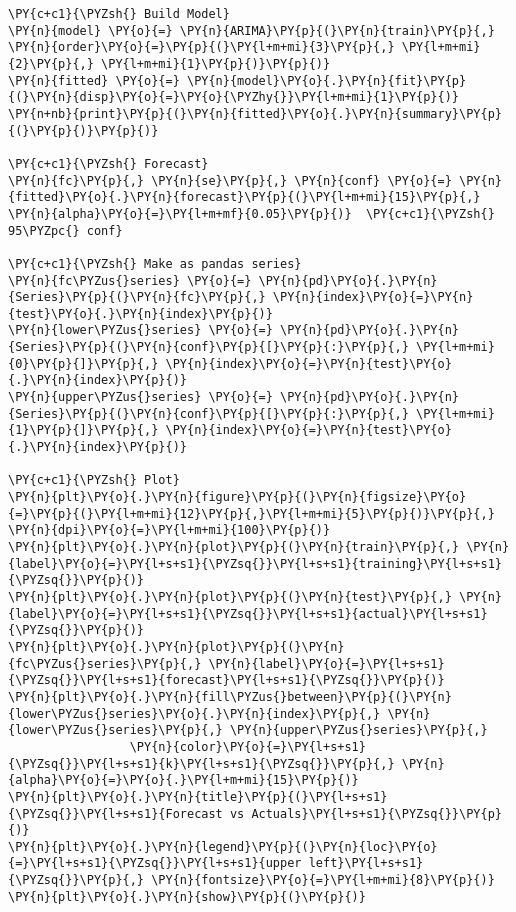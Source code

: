 \begin{tcolorbox}[breakable, size=fbox, boxrule=1pt, pad at break*=1mm,colback=cellbackground, colframe=cellborder]
\begin{Verbatim}[commandchars=\\\{\}]
\PY{c+c1}{\PYZsh{} Build Model}
\PY{n}{model} \PY{o}{=} \PY{n}{ARIMA}\PY{p}{(}\PY{n}{train}\PY{p}{,} \PY{n}{order}\PY{o}{=}\PY{p}{(}\PY{l+m+mi}{3}\PY{p}{,} \PY{l+m+mi}{2}\PY{p}{,} \PY{l+m+mi}{1}\PY{p}{)}\PY{p}{)}  
\PY{n}{fitted} \PY{o}{=} \PY{n}{model}\PY{o}{.}\PY{n}{fit}\PY{p}{(}\PY{n}{disp}\PY{o}{=}\PY{o}{\PYZhy{}}\PY{l+m+mi}{1}\PY{p}{)}  
\PY{n+nb}{print}\PY{p}{(}\PY{n}{fitted}\PY{o}{.}\PY{n}{summary}\PY{p}{(}\PY{p}{)}\PY{p}{)}

\PY{c+c1}{\PYZsh{} Forecast}
\PY{n}{fc}\PY{p}{,} \PY{n}{se}\PY{p}{,} \PY{n}{conf} \PY{o}{=} \PY{n}{fitted}\PY{o}{.}\PY{n}{forecast}\PY{p}{(}\PY{l+m+mi}{15}\PY{p}{,} \PY{n}{alpha}\PY{o}{=}\PY{l+m+mf}{0.05}\PY{p}{)}  \PY{c+c1}{\PYZsh{} 95\PYZpc{} conf}

\PY{c+c1}{\PYZsh{} Make as pandas series}
\PY{n}{fc\PYZus{}series} \PY{o}{=} \PY{n}{pd}\PY{o}{.}\PY{n}{Series}\PY{p}{(}\PY{n}{fc}\PY{p}{,} \PY{n}{index}\PY{o}{=}\PY{n}{test}\PY{o}{.}\PY{n}{index}\PY{p}{)}
\PY{n}{lower\PYZus{}series} \PY{o}{=} \PY{n}{pd}\PY{o}{.}\PY{n}{Series}\PY{p}{(}\PY{n}{conf}\PY{p}{[}\PY{p}{:}\PY{p}{,} \PY{l+m+mi}{0}\PY{p}{]}\PY{p}{,} \PY{n}{index}\PY{o}{=}\PY{n}{test}\PY{o}{.}\PY{n}{index}\PY{p}{)}
\PY{n}{upper\PYZus{}series} \PY{o}{=} \PY{n}{pd}\PY{o}{.}\PY{n}{Series}\PY{p}{(}\PY{n}{conf}\PY{p}{[}\PY{p}{:}\PY{p}{,} \PY{l+m+mi}{1}\PY{p}{]}\PY{p}{,} \PY{n}{index}\PY{o}{=}\PY{n}{test}\PY{o}{.}\PY{n}{index}\PY{p}{)}

\PY{c+c1}{\PYZsh{} Plot}
\PY{n}{plt}\PY{o}{.}\PY{n}{figure}\PY{p}{(}\PY{n}{figsize}\PY{o}{=}\PY{p}{(}\PY{l+m+mi}{12}\PY{p}{,}\PY{l+m+mi}{5}\PY{p}{)}\PY{p}{,} \PY{n}{dpi}\PY{o}{=}\PY{l+m+mi}{100}\PY{p}{)}
\PY{n}{plt}\PY{o}{.}\PY{n}{plot}\PY{p}{(}\PY{n}{train}\PY{p}{,} \PY{n}{label}\PY{o}{=}\PY{l+s+s1}{\PYZsq{}}\PY{l+s+s1}{training}\PY{l+s+s1}{\PYZsq{}}\PY{p}{)}
\PY{n}{plt}\PY{o}{.}\PY{n}{plot}\PY{p}{(}\PY{n}{test}\PY{p}{,} \PY{n}{label}\PY{o}{=}\PY{l+s+s1}{\PYZsq{}}\PY{l+s+s1}{actual}\PY{l+s+s1}{\PYZsq{}}\PY{p}{)}
\PY{n}{plt}\PY{o}{.}\PY{n}{plot}\PY{p}{(}\PY{n}{fc\PYZus{}series}\PY{p}{,} \PY{n}{label}\PY{o}{=}\PY{l+s+s1}{\PYZsq{}}\PY{l+s+s1}{forecast}\PY{l+s+s1}{\PYZsq{}}\PY{p}{)}
\PY{n}{plt}\PY{o}{.}\PY{n}{fill\PYZus{}between}\PY{p}{(}\PY{n}{lower\PYZus{}series}\PY{o}{.}\PY{n}{index}\PY{p}{,} \PY{n}{lower\PYZus{}series}\PY{p}{,} \PY{n}{upper\PYZus{}series}\PY{p}{,} 
                 \PY{n}{color}\PY{o}{=}\PY{l+s+s1}{\PYZsq{}}\PY{l+s+s1}{k}\PY{l+s+s1}{\PYZsq{}}\PY{p}{,} \PY{n}{alpha}\PY{o}{=}\PY{o}{.}\PY{l+m+mi}{15}\PY{p}{)}
\PY{n}{plt}\PY{o}{.}\PY{n}{title}\PY{p}{(}\PY{l+s+s1}{\PYZsq{}}\PY{l+s+s1}{Forecast vs Actuals}\PY{l+s+s1}{\PYZsq{}}\PY{p}{)}
\PY{n}{plt}\PY{o}{.}\PY{n}{legend}\PY{p}{(}\PY{n}{loc}\PY{o}{=}\PY{l+s+s1}{\PYZsq{}}\PY{l+s+s1}{upper left}\PY{l+s+s1}{\PYZsq{}}\PY{p}{,} \PY{n}{fontsize}\PY{o}{=}\PY{l+m+mi}{8}\PY{p}{)}
\PY{n}{plt}\PY{o}{.}\PY{n}{show}\PY{p}{(}\PY{p}{)}


\end{Verbatim}
\end{tcolorbox}

